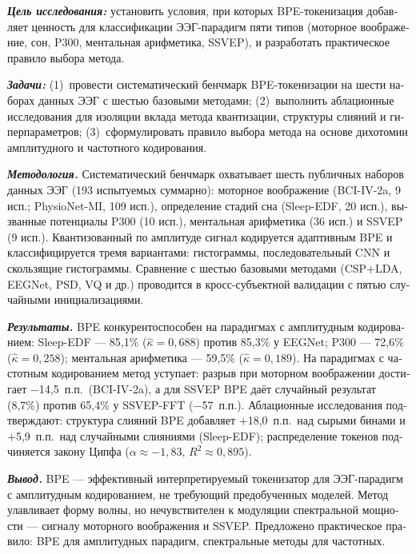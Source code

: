 \documentclass[14pt,a4paper]{extarticle}
\newcommand{\kap}{\ensuremath{\hat{\kappa}}}
\begin{document}
\begin{otherlanguage}{russian}
\begin{mdframed}[backgroundcolor=gray!12, linewidth=0pt,
  innertopmargin=6pt, innerbottommargin=6pt,
  innerleftmargin=8pt, innerrightmargin=8pt]
\textbf{\textit{Цель исследования:}} установить условия, при которых
BPE-токенизация добавляет ценность для классификации ЭЭГ-парадигм
пяти типов (моторное воображение, сон, P300, ментальная арифметика,
SSVEP), и разработать практическое правило выбора метода.

\textbf{\textit{Задачи:}}
(1)~провести систематический бенчмарк BPE-токенизации на шести наборах данных ЭЭГ с шестью базовыми методами;
(2)~выполнить аблационные исследования для изоляции вклада метода квантизации, структуры слияний и гиперпараметров;
(3)~сформулировать правило выбора метода на основе дихотомии амплитудного и частотного кодирования.

\textbf{\textit{Методология.}}
Систематический бенчмарк охватывает шесть публичных наборов данных ЭЭГ
(193 испытуемых суммарно): моторное воображение (BCI-IV-2a, 9 исп.;
PhysioNet-MI, 109 исп.), определение стадий сна (Sleep-EDF, 20 исп.),
вызванные потенциалы P300 (10 исп.), ментальная арифметика (36 исп.)
и SSVEP (9 исп.).
Квантизованный по амплитуде сигнал кодируется адаптивным BPE
и классифицируется тремя вариантами: гистограммы, последовательный CNN
и скользящие гистограммы.
Сравнение с шестью базовыми методами (CSP+LDA, EEGNet, PSD, VQ и др.)
проводится в кросс-субъектной валидации с пятью случайными
инициализациями.

\textbf{\textit{Результаты.}}
BPE конкурентоспособен на парадигмах с амплитудным кодированием:
Sleep-EDF --- 85,1\% ($\kap{=}0{,}688$) против 85,3\% у EEGNet;
P300 --- 72,6\% ($\kap{=}0{,}258$);
ментальная арифметика --- 59,5\% ($\kap{=}0{,}189$).
На парадигмах с частотным кодированием метод уступает: разрыв при
моторном воображении достигает $-$14,5~п.п.\ (BCI-IV-2a), а для SSVEP
BPE даёт случайный результат (8,7\%) против 65,4\% у SSVEP-FFT
($-$57~п.п.).
Аблационные исследования подтверждают: структура слияний BPE добавляет
$+$18,0~п.п.\ над сырыми бинами и $+$5,9~п.п.\ над случайными слияниями
(Sleep-EDF); распределение токенов подчиняется закону Ципфа
($\alpha{\approx}{-}1{,}83$, $R^2{\approx}0{,}895$).

\textbf{\textit{Вывод.}}
BPE --- эффективный интерпретируемый токенизатор для ЭЭГ-парадигм
с амплитудным кодированием, не требующий предобученных моделей.
Метод улавливает форму волны, но нечувствителен к модуляции
спектральной мощности --- сигналу моторного воображения и SSVEP.
Предложено практическое правило: BPE для амплитудных парадигм,
спектральные методы для частотных.
\end{mdframed}

\medskip


\end{otherlanguage}
\end{document}
